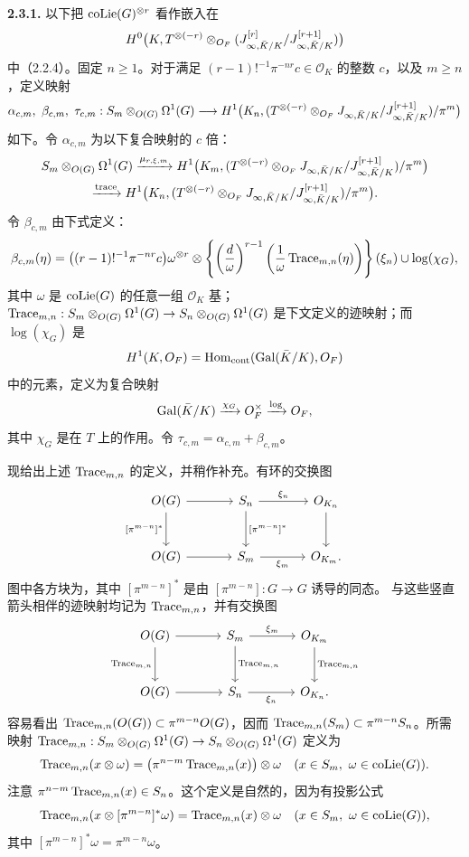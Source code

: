 \noindent\textbf{2.3.1.} 以下把 $\operatorname{coLie}(G)^{\otimes r}$ 看作嵌入在
\[
H^0\bigl(K,T^{\otimes(-r)}\otimes_{O_F}
(J_{\infty,\bar K/K}^{[r]}/J_{\infty,\bar K/K}^{[r+1]})\bigr)
\]
中（2.2.4）。固定 $n\geq1$。对于满足
$(r-1)!^{-1}\pi^{-nr}c\in\mathcal O_K$ 的整数 $c$，以及 $m\geq n$，定义映射
\[
\alpha_{c,m},\ \beta_{c,m},\ \tau_{c,m}:
S_m\otimes_{O(G)}\Omega^1(G)\longrightarrow
H^1\bigl(K_n,(T^{\otimes(-r)}\otimes_{O_F}
J_{\infty,\bar K/K}/J_{\infty,\bar K/K}^{[r+1]})/\pi^m\bigr)
\]
如下。令 $\alpha_{c,m}$ 为以下复合映射的 $c$ 倍：
\begin{gather*}
S_m\otimes_{O(G)}\Omega^1(G)\xrightarrow{\mu_{r,\xi,m}}
H^1\bigl(K_m,(T^{\otimes(-r)}\otimes_{O_F}
J_{\infty,\bar K/K}/J_{\infty,\bar K/K}^{[r+1]})/\pi^m\bigr)\\
\xrightarrow{\mathrm{trace}}
H^1\bigl(K_n,(T^{\otimes(-r)}\otimes_{O_F}
J_{\infty,\bar K/K}/J_{\infty,\bar K/K}^{[r+1]})/\pi^m\bigr).
\end{gather*}
令 $\beta_{c,m}$ 由下式定义：
\[
\beta_{c,m}(\eta)=
\bigl((r-1)!^{-1}\pi^{-nr}c\bigr)\omega^{\otimes r}
\otimes\left\{\left(\frac d\omega\right)^{r-1}
\left(\frac1\omega\operatorname{Trace}_{m,n}(\eta)\right)\right\}(\xi_n)
\cup\log(\chi_G),
\]
其中 $\omega$ 是 $\operatorname{coLie}(G)$ 的任意一组 $\mathcal O_K$ 基；
$\operatorname{Trace}_{m,n}:S_m\otimes_{O(G)}\Omega^1(G)\to S_n\otimes_{O(G)}\Omega^1(G)$
是下文定义的迹映射；而 $\log(\chi_G)$ 是
\[
H^1(K,O_F)=\operatorname{Hom}_{\mathrm{cont}}(\operatorname{Gal}(\bar K/K),O_F)
\]
中的元素，定义为复合映射
\[
\operatorname{Gal}(\bar K/K)\xrightarrow{\chi_G}O_F^\times
\xrightarrow{\log}O_F,
\]
其中 $\chi_G$ 是在 $T$ 上的作用。令 $\tau_{c,m}=\alpha_{c,m}+\beta_{c,m}$。

现给出上述 $\operatorname{Trace}_{m,n}$ 的定义，并稍作补充。有环的交换图
\[
\begin{tikzcd}[ampersand replacement=\&,column sep=large,row sep=large]
\kaOG\arrow[r]\arrow[d,"{[\pi^{m-n}]^*}"']\&S_n\arrow[r,"{\xi_n}"]\arrow[d,"{[\pi^{m-n}]^*}"]\&\mathcal O_{K_n}\arrow[d]\\
\kaOG\arrow[r]\&S_m\arrow[r,"{\xi_m}"']\&\mathcal O_{K_m}.
\end{tikzcd}
\]
图中各方块为，其中
$[\pi^{m-n}]^*$ 是由 $[\pi^{m-n}]:G\to G$ 诱导的同态。
与这些竖直箭头相伴的迹映射均记为 $\operatorname{Trace}_{m,n}$，并有交换图
\[
\begin{tikzcd}[ampersand replacement=\&,column sep=large,row sep=large]
\kaOG\arrow[r]\arrow[d,"{\kaTr_{m,n}}"']\&S_m\arrow[r,"{\xi_m}"]\arrow[d,"{\kaTr_{m,n}}"]\&\mathcal O_{K_m}\arrow[d,"{\kaTr_{m,n}}"]\\
\kaOG\arrow[r]\&S_n\arrow[r,"{\xi_n}"']\&\mathcal O_{K_n}.
\end{tikzcd}
\]
容易看出 $\operatorname{Trace}_{m,n}(O(G))\subset\pi^{m-n}O(G)$，因而
$\operatorname{Trace}_{m,n}(S_m)\subset\pi^{m-n}S_n$。所需映射
$\operatorname{Trace}_{m,n}:S_m\otimes_{O(G)}\Omega^1(G)\to S_n\otimes_{O(G)}\Omega^1(G)$
定义为
\[
\operatorname{Trace}_{m,n}(x\otimes\omega)=
\bigl(\pi^{n-m}\operatorname{Trace}_{m,n}(x)\bigr)\otimes\omega
\quad(x\in S_m,\ \omega\in\operatorname{coLie}(G)).
\]
注意 $\pi^{n-m}\operatorname{Trace}_{m,n}(x)\in S_n$。这个定义是自然的，因为有投影公式
\[
\operatorname{Trace}_{m,n}(x\otimes[\pi^{m-n}]^*\omega)=\operatorname{Trace}_{m,n}(x)\otimes\omega
\quad(x\in S_m,\ \omega\in\operatorname{coLie}(G)),
\]
其中 $[\pi^{m-n}]^*\omega=\pi^{m-n}\omega$。

